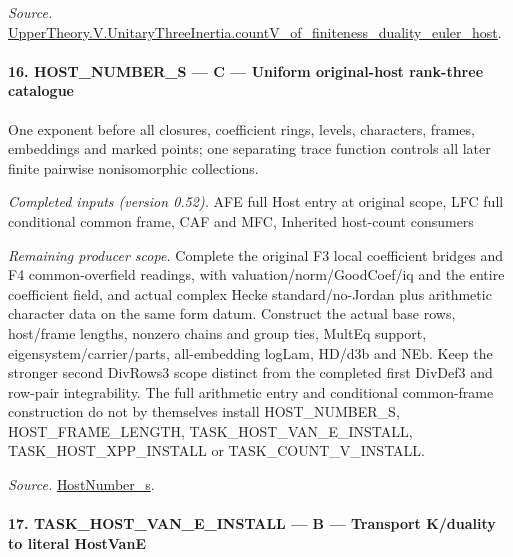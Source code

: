 \documentclass[11pt,a4paper]{article}
\numberwithin{equation}{section}
\theoremstyle{remark}\newtheorem{remark}[theorem]{Remark}
\begin{document}
\emph{Source.} \href{https://github.com/CocoSgt/riemann-hypothesis-lean/blob/7cbf7a0c32fca1badf05931879a37c3f8a2b03b4/src/Development/AutomorphicArithmetic/AutomorphicVarieties/ModularityArgument/ThresholdArguments/DenseThresholdCases/CountVOf.lean#L33-L60}{UpperTheory.V.UnitaryThreeInertia.countV\_\allowbreak of\_\allowbreak finiteness\_\allowbreak duality\_\allowbreak euler\_\allowbreak host}.



\paragraph{16. HOST\_\allowbreak NUMBER\_\allowbreak S — C — Uniform original-host rank-three catalogue}

One exponent before all closures, coefficient rings, levels, characters, frames, embeddings and marked points; one separating trace function controls all later finite pairwise nonisomorphic collections.

\emph{Completed inputs (version 0.52).} AFE full Host entry at original scope, LFC full conditional common frame, CAF and MFC, Inherited host-count consumers

\emph{Remaining producer scope.} Complete the original F3 local coefficient bridges and F4 common-overfield readings, with valuation/norm/GoodCoef/iq and the entire coefficient field, and actual complex Hecke standard/no-Jordan plus arithmetic character data on the same form datum. Construct the actual base rows, host/frame lengths, nonzero chains and group ties, MultEq support, eigensystem/carrier/parts, all-embedding logLam, HD/d3b and NEb. Keep the stronger second DivRows3 scope distinct from the completed first DivDef3 and row-pair integrability. The full arithmetic entry and conditional common-frame construction do not by themselves install HOST\_\allowbreak NUMBER\_\allowbreak S, HOST\_\allowbreak FRAME\_\allowbreak LENGTH, TASK\_\allowbreak HOST\_\allowbreak VAN\_\allowbreak E\_\allowbreak INSTALL, TASK\_\allowbreak HOST\_\allowbreak XPP\_\allowbreak INSTALL or TASK\_\allowbreak COUNT\_\allowbreak V\_\allowbreak INSTALL.

\emph{Source.} \href{https://github.com/CocoSgt/riemann-hypothesis-lean/blob/7cbf7a0c32fca1badf05931879a37c3f8a2b03b4/src/Development/AutomorphicArithmetic/AutomorphicVarieties/ModularityArgument/ThresholdArguments/DenseThresholdCases/HostNumberS.lean#L18-L28}{HostNumber\_\allowbreak s}.



\paragraph{17. TASK\_\allowbreak HOST\_\allowbreak VAN\_\allowbreak E\_\allowbreak INSTALL — B — Transport K/duality to literal HostVanE}
\end{document}
